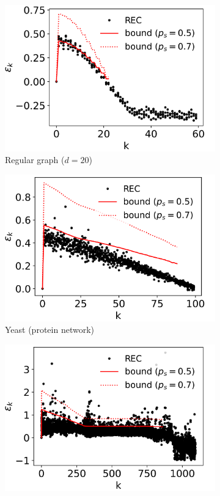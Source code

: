 \begin{figure}[ht]
	\centering
	\begin{subfigure}{0.33\textwidth}
		\includegraphics[width=\linewidth]{gfx/cons/example/regular.png}
		\caption{Regular graph ($d = 20$)}\label{fig:cons:example:regular}
	\end{subfigure}%
	\begin{subfigure}{0.33\textwidth}
		\includegraphics[width=\linewidth]{gfx/cons/example/yeast.png}
		\caption{Yeast (protein network)}\label{fig:cons:example:yeast}
	\end{subfigure}%
	\begin{subfigure}{0.33\textwidth}
		\includegraphics[width=\linewidth]{gfx/cons/example/roll.png}

\end{subfigure}
\end{figure}

